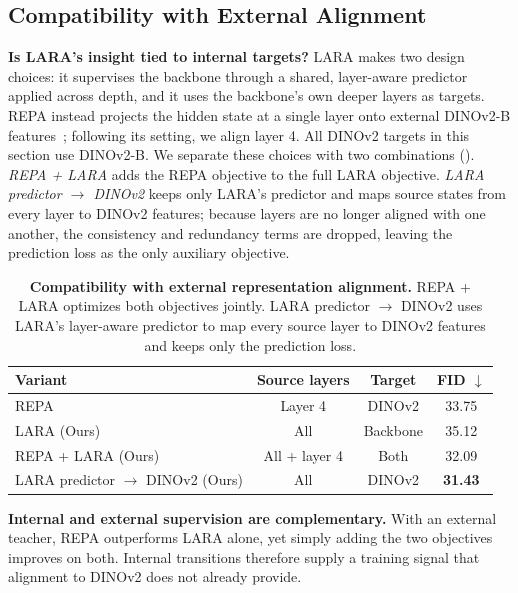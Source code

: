 \subsection{Compatibility with External Alignment}
\label{sec:external_alignment_compatibility}

\textbf{Is LARA's insight tied to internal targets?} LARA makes two design choices: it supervises the backbone through a shared, layer-aware predictor applied across depth, and it uses the backbone's own deeper layers as targets. REPA instead projects the hidden state at a single layer onto external DINOv2-B features~\citep{yu2024repa}; following its setting, we align layer 4. All DINOv2 targets in this section use DINOv2-B. We separate these choices with two combinations (). \emph{REPA + LARA} adds the REPA objective to the full LARA objective. \emph{LARA predictor $\to$ DINOv2} keeps only LARA's predictor and maps source states from every layer to DINOv2 features; because layers are no longer aligned with one another, the consistency and redundancy terms are dropped, leaving the prediction loss as the only auxiliary objective.

\begin{table}[!htbp]
    \centering
    \caption{\textbf{Compatibility with external representation alignment.} REPA + LARA optimizes both objectives jointly. LARA predictor $\to$ DINOv2 uses LARA's layer-aware predictor to map every source layer to DINOv2 features and keeps only the prediction loss.}
    \label{tab:external_alignment_compatibility}
    \footnotesize
    \setlength{\tabcolsep}{3pt}
    \begin{tabular*}{\linewidth}{@{\extracolsep{\fill}}lccc@{}}
        \toprule
        Variant & Source layers & Target & FID $\downarrow$ \\
        \midrule
        REPA & Layer 4 & DINOv2 & 33.75 \\
        LARA (Ours) & All & Backbone & 35.12 \\
        \midrule
        REPA + LARA (Ours) & All + layer 4 & Both & 32.09 \\
        LARA predictor $\to$ DINOv2 (Ours) & All & DINOv2 & \textbf{31.43} \\
        \bottomrule
    \end{tabular*}
\end{table}

\textbf{Internal and external supervision are complementary.} With an external teacher, REPA outperforms LARA alone, yet simply adding the two objectives improves on both. Internal transitions therefore supply a training signal that alignment to DINOv2 does not already provide.

